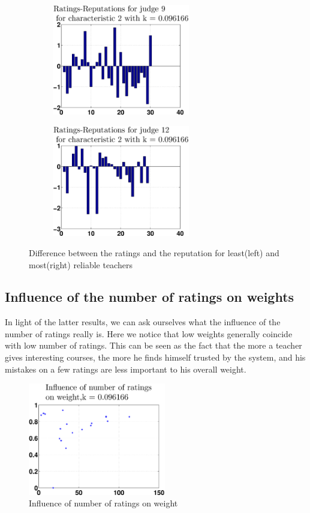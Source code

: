 \documentclass[12pt,a4paper]{article}
\begin{document}
\begin{figure}[!h]
\centering
\begin{subfigure}[b]{0.48\textwidth}
\includegraphics[width = 6cm]{preprocessSelect/ppsdiffRaReLeastK3fb89e54e9211a25c2.eps}
\end{subfigure}
\begin{subfigure}[b]{0.48\textwidth}
\includegraphics[width = 6cm]{preprocessSelect/ppsdiffRaReMostK3fb89e54e9211a25c2.eps}
\end{subfigure}
\caption{\label{diffLM}Difference between the ratings and the reputation for least(left) and most(right) reliable teachers}
\end{figure}

\subsection*{Influence of the number of ratings on weights}
In light of the latter results, we can ask ourselves what the influence of the number of ratings really is. Here we notice that low weights generally coincide with low number of ratings. This can be seen as the fact that the more a teacher gives interesting courses, the more he finds himself trusted by the system, and his mistakes on a few ratings are less important to his overall weight.
\begin{figure}
\centering
\includegraphics[width = 6cm]{preprocessSelect/ppsnumRatvsWK3fb89e54e9211a25.eps}
\caption{Influence of number of ratings on weight}
\end{figure}
\end{document}
